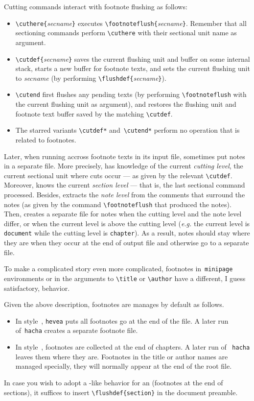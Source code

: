 Cutting commands interact with footnote flushing as follows:
\begin{itemize}
\item \verb+\cuthere{+\textit{secname}\verb+}+
executes \verb+\footnoteflush{+\textit{secname}\verb+}+.
Remember that all sectioning commands perform
\verb+\cuthere+ with their sectional unit name as argument.
\item \verb+\cutdef{+\textit{secname}\verb+}+
saves the current flushing unit and  buffer on some internal stack,
starts a new buffer for footnote texts, and
sets the current flushing unit to \textit{secname}
(by performing \verb+\flushdef{+\textit{secname}\verb+}+).
\item \verb+\cutend+ first flushes any pending texts
(by performing \verb+\footnoteflush+ with the current flushing unit
as argument), and restores the flushing unit and footnote text buffer saved
by the matching \verb+\cutdef+.
\item The starred variants \verb+\cutdef*+ and~\verb+\cutend*+ perform
no operation that is related to footnotes.
\end{itemize}

Later, when running accross footnote texts in its input file, \hacha{}
sometimes put notes in a separate file.
More precisely, \hacha{} has knowledge of the
current \emph{cutting level}, the current sectional unit where
cuts occur --- as given by the relevant \verb+\cutdef+.
Moreover, \hacha{} knows the current \emph{section level} ---
that is, the last sectional command processed.
Besides, \hacha{} extracts the \emph{note level} from the comments
that surround the notes (as given by the command
\verb+\footnoteflush+ that produced the notes).
Then, \hacha{} creates a separate file for notes
when the cutting level and the note level differ,
or when the current level is above the cutting level
(\emph{e.g.} the current level is \texttt{document} while the cutting
level is \texttt{chapter}).
As a result, notes should stay where they are when they occur at the end of
\hacha{} output file and otherwise go to a separate file.

To make a complicated story even more complicated,
footnotes in~\texttt{minipage} environments or in the arguments
to \verb+\title+ or \verb+\author+ have a different, I guess satisfactory,
behavior.

Given the above description, footnotes are manages by default as follows.
\begin{itemize}
\item In style~, \texttt{hevea} puts all footnotes
go at the end of the \html{} file.
A later run of~\texttt{hacha} creates a separate footnote file.
\item In style~, footnotes are collected at the end of
chapters. A later run of ~\texttt{hacha} leaves them where they
are. Footnotes in the title or author names are managed specially,
they will normally appear at the end of the root file.
\end{itemize}
%
In case you wish to adopt a -like behavior for
an  (footnotes at the end of sections),
it suffices to insert \verb+\flushdef{section}+ in the document
preamble.


